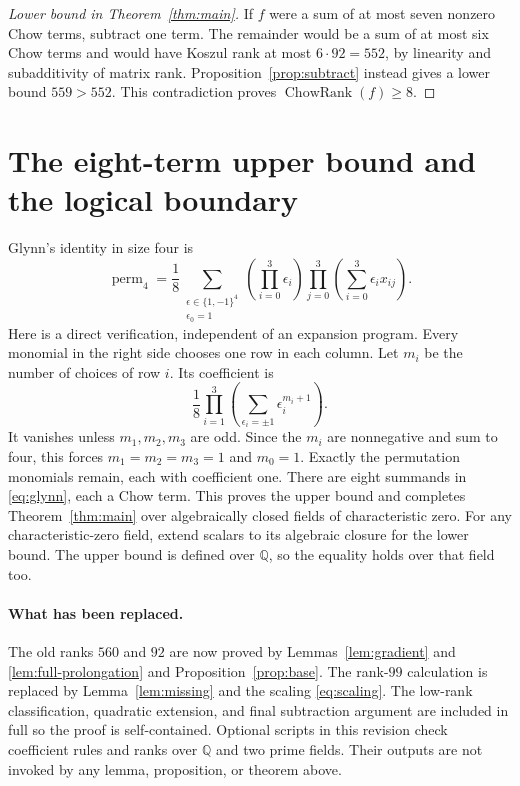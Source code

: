 \documentclass[11pt]{article}
\theoremstyle{remark}
\newcommand{\perm}{\operatorname{perm}}
\newcommand{\ChowRank}{\operatorname{ChowRank}}
\begin{document}
\begin{proof}[Lower bound in Theorem~\ref{thm:main}]
If $f$ were a sum of at most seven nonzero Chow terms, subtract one term.
The remainder would be a sum of at most six Chow terms and would have
Koszul rank at most $6\cdot92=552$, by linearity and subadditivity of
matrix rank. Proposition~\ref{prop:subtract} instead gives a lower bound
$559>552$. This contradiction proves $\ChowRank(f)\geq8$.
\end{proof}

\section{The eight-term upper bound and the logical boundary}
Glynn's identity \cite{glynn} in size four is
\begin{equation}\label{eq:glynn}
 \perm_4=\frac18\sum_{\substack{\epsilon\in\{1,-1\}^4\\\epsilon_0=1}}
       \left(\prod_{i=0}^3\epsilon_i\right)
       \prod_{j=0}^3\left(\sum_{i=0}^3\epsilon_i x_{ij}\right).
\end{equation}
Here is a direct verification, independent of an expansion program.
Every monomial in the right side chooses one row in each column.
Let $m_i$ be the number of choices of row $i$. Its coefficient is
\[
 \frac18\prod_{i=1}^3\left(\sum_{\epsilon_i=\pm1}
                                 \epsilon_i^{m_i+1}\right).
\]
It vanishes unless $m_1,m_2,m_3$ are odd. Since the $m_i$ are nonnegative
and sum to four, this forces $m_1=m_2=m_3=1$ and $m_0=1$.
Exactly the permutation monomials remain, each with coefficient one.
There are eight summands in \eqref{eq:glynn}, each a Chow term. This proves
the upper bound and completes Theorem~\ref{thm:main} over algebraically
closed fields of characteristic zero. For any characteristic-zero field,
extend scalars to its algebraic closure for the lower bound. The upper
bound is defined over $\mathbb Q$, so the equality holds over that field too.

\paragraph{What has been replaced.}
The old ranks $560$ and $92$ are now proved by
Lemmas~\ref{lem:gradient} and \ref{lem:full-prolongation} and
Proposition~\ref{prop:base}. The rank-$99$ calculation is replaced by
Lemma~\ref{lem:missing} and the scaling \eqref{eq:scaling}. The low-rank
classification, quadratic extension, and final subtraction argument are
included in full so the proof is self-contained.
Optional scripts in this revision check coefficient rules and ranks over
$\mathbb Q$ and two prime fields. Their outputs are not invoked by any
lemma, proposition, or theorem above.
\end{document}
